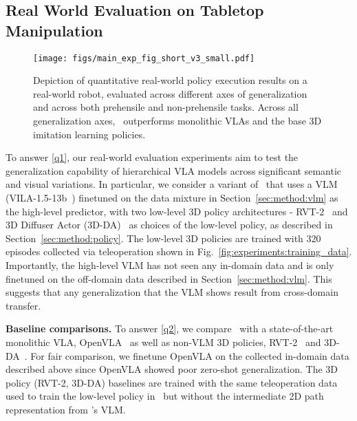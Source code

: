 \vspace{-2mm}
\subsection{Real World Evaluation on Tabletop Manipulation}
\vspace{-2mm}

\begin{figure}[!tb]
    \centering
    \texttt{[image: figs/main\_exp\_fig\_short\_v3\_small.pdf]}
    \caption{\footnotesize{Depiction of quantitative real-world policy execution results on a real-world robot, evaluated across different axes of generalization and across both prehensile and non-prehensile tasks. Across all generalization axes, \method \ outperforms monolithic VLAs and the base 3D imitation learning policies.}}
    \label{fig:experiments:main_exp}
    \vspace{-4mm}
\end{figure}
To answer \ref{q1}, our real-world evaluation experiments aim to test the generalization capability of hierarchical VLA models across significant semantic and visual variations. In particular, we consider a variant of \method\ that uses a VLM (VILA-1.5-13b~\citep{vila2024}) finetuned on the data mixture in Section~\ref{sec:method:vlm} as the high-level predictor, with two low-level 3D policy architectures - RVT-2~\citep{goyal2024rvt} and 3D Diffuser Actor (3D-DA)~\citep{ke20243d} as choices of the low-level policy, as described in Section~\ref{sec:method:policy}. The low-level 3D policies are trained with $320$ episodes collected via teleoperation %
shown in Fig.~\ref{fig:experiments:training_data}. Importantly, the high-level VLM %
has not seen any in-domain data and is only finetuned on the off-domain data described in Section~\ref{sec:method:vlm}. This suggests that any generalization that the VLM shows result from %
cross-domain transfer. 


\textbf{Baseline comparisons.} To answer \ref{q2}, we compare \method\ with a state-of-the-art monolithic VLA, OpenVLA~\citep{kim2024openvla} as well as non-VLM 3D policies, RVT-2~\citep{goyal2024rvt} and 3D-DA~\citep{ke20243d}. For fair comparison, we finetune OpenVLA on the collected in-domain data described above since OpenVLA showed poor zero-shot generalization. 
The 3D policy (RVT-2, 3D-DA) baselines are trained with the same teleoperation data used to train the low-level policy in \method\ but without the intermediate 2D path representation from \method 's VLM.

